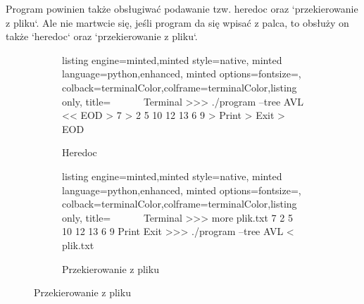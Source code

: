 Program powinien także obsługiwać podawanie tzw. heredoc oraz `przekierowanie z pliku`. Ale nie martwcie się, jeśli program da się wpisać z palca, to obsłuży on także `heredoc` oraz `przekierowanie z pliku`.


\begin{figure}[H]
\begin{subfigure}{0.48\textwidth}
    \centering
\begin{tcblisting}{listing engine=minted,minted style=native,
    minted language=python,enhanced,
    minted options={fontsize=\tiny},  
    colback=terminalColor,colframe=terminalColor,listing only, title= ~~~~~~Terminal}
>>>  ./program --tree AVL << EOD
> 7
> 2 5 10 12 13 6 9
> Print
> Exit
> EOD
\end{tcblisting}
    \caption{Heredoc}
    \label{fig:avl:create}
\end{subfigure}
\hfill
\begin{subfigure}{0.48\textwidth}
    \centering
\begin{tcblisting}{listing engine=minted,minted style=native,
    minted language=python,enhanced,
    minted options={fontsize=\tiny},  
    colback=terminalColor,colframe=terminalColor,listing only, title= ~~~~~~Terminal}
>>> more plik.txt
7
2 5 10 12 13 6 9
Print
Exit
>>>  ./program --tree AVL < plik.txt
\end{tcblisting}
    \caption{Przekierowanie z pliku}
    \label{fig:bst:create}
\end{subfigure}
\end{figure}

